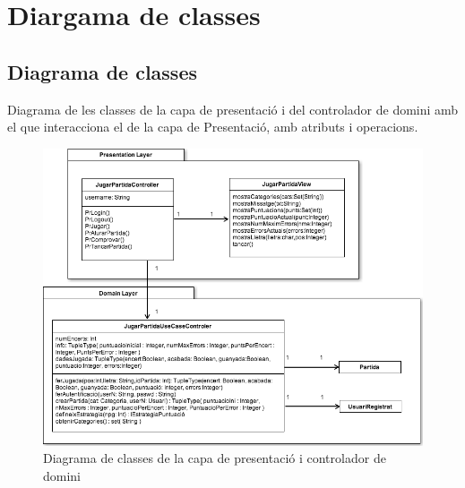 
\section{Diargama de classes}

\subsection{Diagrama de classes}
Diagrama de les classes de la capa de presentació i del controlador de domini amb el que interacciona el de la capa de Presentació, amb atributs i operacions.

    \begin{figure}[h]
    \centering
    \includegraphics[width=1.0\textwidth]{images/classDiagram.png}
    \caption{ Diagrama de classes de la capa de presentació i controlador de domini }
    \end{figure}

